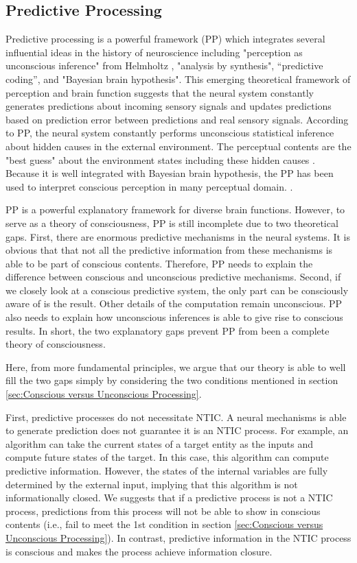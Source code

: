 \documentclass[utf8]{article}
\begin{document}
		\subsection{Predictive Processing}
    		Predictive processing is a powerful framework (PP) which integrates several influential ideas in the history of neuroscience including "perception as unconscious inference" from Helmholtz \citet{helmholtz1866concerning}, "analysis by synthesis", “predictive coding”, and "Bayesian brain hypothesis". This emerging theoretical framework of perception and brain function suggests that the neural system constantly generates predictions about incoming sensory signals and updates predictions based on prediction error between predictions and real sensory signals. According to PP, the neural system constantly performs unconscious statistical inference about hidden causes in the external environment. The perceptual contents are the "best guess" about the environment states including these hidden causes \citep{clark_2013, Hohwy2013}. Because it is well integrated with Bayesian brain hypothesis, the PP has been used to interpret conscious perception in many perceptual domain. \cite{Hohwy2013} \cite{SethPP2014}.
    		
    		
    		PP is a powerful explanatory framework for diverse brain functions. However, to serve as a theory of consciousness, PP is still incomplete due to two theoretical gaps. First, there are enormous predictive mechanisms in the neural systems. It is  obvious that that not all the predictive information from these mechanisms is able to be part of conscious contents. Therefore, PP needs to explain the difference between conscious and unconscious predictive mechanisms. Second, if we closely look at a conscious predictive system, the only part can be consciously aware of is the result. Other details of the computation remain unconscious. PP also needs to explain how unconscious inferences is able to give rise to conscious results. In short, the two explanatory gaps prevent PP from been a complete theory of consciousness. 
    		
    		Here, from more fundamental principles, we  argue that our theory is able to well fill the two gaps simply by considering the two conditions mentioned in section \ref{sec:Conscious versus Unconscious Processing}.
    		
    		First, predictive processes do not necessitate NTIC. A neural mechanisms is able to generate prediction does not guarantee it is an NTIC process. For example, an algorithm can take the current states of a target entity as the inputs and compute future states of the target. In this case, this algorithm can compute predictive information. However, the states of the internal variables are fully determined by the external input, implying that this algorithm is not informationally closed. We suggests that if a predictive process is not a NTIC process, predictions from this process will not be able to show in conscious contents (i.e., fail to meet the 1\lowercase{st} condition in section \ref{sec:Conscious versus Unconscious Processing}). In contrast, predictive information in the NTIC process is conscious and makes the process achieve information closure. 
    		
\end{document}
